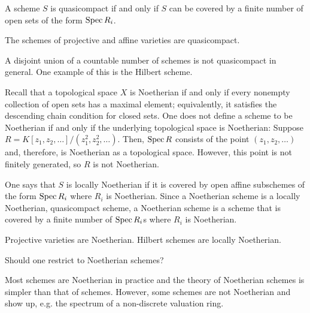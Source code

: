 \documentclass [11 pt, oneside] {article}
\begin{document}
\begin{remark}
	A scheme $S$ is quasicompact if and only if $S$ can be covered by a finite number of open sets of the form $\operatorname{Spec} R_i$.
\end{remark}

\begin{example}[ ]\label{}\text{}
The schemes of projective and affine varieties are quasicompact. 
\end{example}

\begin{example}[ ]\label{}\text{}
A disjoint union of a countable number of schemes is not quasicompact in general. One example of this is the Hilbert scheme.
\end{example}

Recall that a topological space $X$ is Noetherian if and only if every nonempty collection of open sets has a maximal element; equivalently, it satisfies the descending chain condition for closed sets. 
One does not define a scheme to be Noetherian if and only if the underlying topological space is Noetherian: Suppose $R = K[z_1,z_2,\hdots]/(z_1^2,z_2^2,\hdots)$. Then, $\operatorname{Spec} R$ consists of the point $(z_1,z_2,\hdots)$ and, therefore, is Noetherian as a topological space. However, this point is not finitely generated, so $R$ is not Noetherian.

One says that $S$ is locally Noetherian if it is covered by open affine subschemes of the form $\operatorname{Spec} R_i$ where $R_i$ is Noetherian. Since a Noetherian scheme is a locally Noetherian, quasicompact scheme, a Noetherian scheme is a scheme that is covered by a finite number of $\operatorname{Spec} R_i$s where $R_i$ is Noetherian.

\begin{example}[ ]\label{}\text{}
Projective varieties are Noetherian. Hilbert schemes are locally Noetherian.
\end{example}

\begin{problem}
	Should one restrict to Noetherian schemes?
\end{problem}

Most schemes are Noetherian in practice and the theory of Noetherian schemes is simpler than that of schemes. However, some schemes are not Noetherian and show up, e.g. the spectrum of a non-discrete valuation ring.
\end{document}

